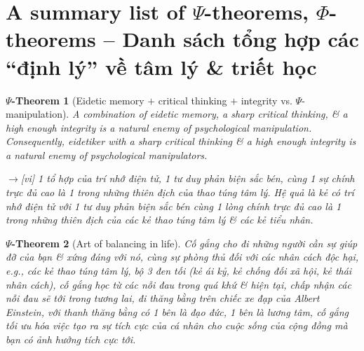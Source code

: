 \documentclass[12pt,oneside]{book}
\newtheorem{psy-theorem}{$\Psi$-Theorem}
\begin{document}
\section{A summary list of $\Psi$-theorems, $\Phi$-theorems -- Danh sách tổng hợp các ``định lý'' về tâm lý \& triết học}

\begin{psy-theorem}[Eidetic memory $+$ critical thinking $+$ integrity vs. $\Psi$-manipulation]
	A combination of eidetic memory, a sharp critical thinking, \& a high enough integrity is a natural enemy of psychological manipulation. Consequently, eidetiker with a sharp critical thinking \& a high enough integrity is a natural enemy of psychological manipulators.
	
	{\sf[en]$\to$[vi]} 1 tổ hợp của trí nhớ điện tử, 1 tư duy phản biện sắc bén, cùng 1 sự chính trực đủ cao là 1 trong những thiên địch của thao túng tâm lý. Hệ quả là kẻ có trí nhớ điện tử với 1 tư duy phản biện sắc bén cùng 1 lòng chính trực đủ cao là 1 trong những thiên địch của các kẻ thao túng tâm lý \& các kẻ tiểu nhân.
\end{psy-theorem}

\begin{psy-theorem}[Art of balancing in life]
	Cố gắng cho đi những người cần sự giúp đỡ của bạn \& xứng đáng với nó, cùng sự phòng thủ đối với các nhân cách độc hại, e.g., các kẻ thao túng tâm lý, bộ 3 đen tối (kẻ ái kỷ, kẻ chống đối xã hội, kẻ thái nhân cách), cố gắng học từ các nỗi đau trong quá khứ \& hiện tại, chấp nhận các nỗi đau sẽ tới trong tương lai, đi thăng bằng trên chiếc xe đạp của {\sc Albert Einstein}, với thanh thăng bằng có 1 bên là đạo đức, 1 bên là lương tâm, cố gắng tối ưu hóa việc tạo ra sự tích cực của cá nhân cho cuộc sống của cộng đồng mà bạn có ảnh hưởng tích cực tới.
\end{psy-theorem}
\end{document}
